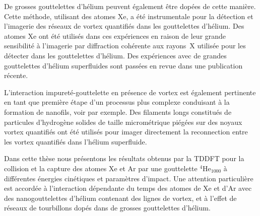		De grosses gouttelettes d'hélium peuvent également être dopées de cette manière. 
		Cette méthode, utilisant des atomes Xe, a été instrumentale pour la détection et l'imagerie des réseaux de vortex quantifiés dans les gouttelettes d'hélium\citep{Gom14,Jones2016}. 
		Des atomes Xe ont été utilisés dans ces expériences en raison de leur grande sensibilité à l'imagerie par diffraction cohérente aux rayons~X utilisée pour les détecter dans les gouttelettes d'hélium. 
		Des expériences avec de grandes gouttelettes d'hélium superfluides sont passées en revue dans une publication récente\citep{Tan17}.
		
		L'interaction impureté-gouttelette en présence de vortex est également pertinente en tant que première étape d'un processus plus complexe conduisant à la formation de nanofils, voir par exemple. 
		Des filaments longs constitués de particules d'hydrogène solides de taille micrométrique piégées sur des noyaux vortex quantifiés ont été utilisés pour imager directement la reconnection  entre les vortex quantifiés dans l'hélium superfluide\citep{Bewley2008}.
		
		Dans cette thèse nous présentons les résultats obtenus par la TDDFT pour la collision et la capture des atomes Xe et Ar par une gouttelette $^4$He$_{1000}$ à différentes énergies cinétiques et paramètres d'impact. 
		Une attention particulière est accordée à l'interaction dépendante du temps des atomes de Xe et d'Ar avec des nanogouttelettes d'hélium contenant des lignes de vortex, et à l'effet de réseaux de tourbillons dopés  dans de grosses gouttelettes d'hélium.
		
